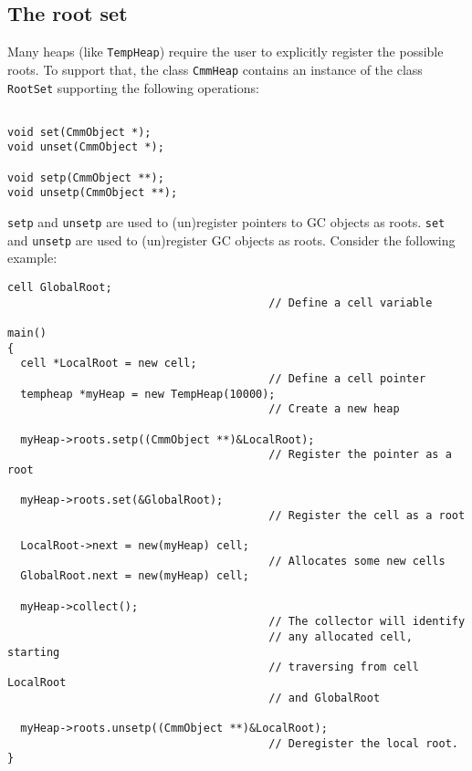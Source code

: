 \subsection{The root set}

Many heaps (like {\tt TempHeap}) require the user to explicitly
register the possible roots.
To support that, the class {\tt CmmHeap} contains an instance of the class
{\tt RootSet} supporting the following operations:

\begin{verbatim}

void set(CmmObject *);
void unset(CmmObject *);

void setp(CmmObject **);
void unsetp(CmmObject **);
\end{verbatim}

{\tt setp} and {\tt unsetp} are used to (un)register pointers to GC objects as
roots.  {\tt set} and {\tt unsetp} are used to (un)register GC objects as
roots.  Consider the following example:

\begin{verbatim}
cell GlobalRoot;                            
                                        // Define a cell variable

main()
{
  cell *LocalRoot = new cell;               
                                        // Define a cell pointer
  tempheap *myHeap = new TempHeap(10000); 
                                        // Create a new heap

  myHeap->roots.setp((CmmObject **)&LocalRoot);  
                                        // Register the pointer as a root

  myHeap->roots.set(&GlobalRoot);           
                                        // Register the cell as a root

  LocalRoot->next = new(myHeap) cell;   
                                        // Allocates some new cells
  GlobalRoot.next = new(myHeap) cell;

  myHeap->collect();                        
                                        // The collector will identify
                                        // any allocated cell, starting
                                        // traversing from cell LocalRoot
                                        // and GlobalRoot

  myHeap->roots.unsetp((CmmObject **)&LocalRoot);
                                        // Deregister the local root.
}
\end{verbatim}

